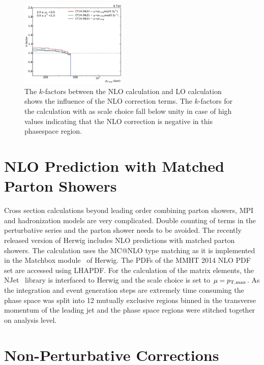 \begin{figure}[htp]
    \includegraphics[width=0.45\textwidth]{figures/theory/kfactor_comp_yb2ys0.pdf}
    \caption{The $k$-factors between the NLO calculation and LO calculation
        shows the influence of the NLO correction terms. The $k$-factors for the
        calculation with \ptavg as scale choice fall below unity in case of high
        \ystar values indicating that the NLO correction is negative in this
        phasespace region.}
    \label{fig:kfactor_comp}
\end{figure}

\section{NLO Prediction with Matched Parton Showers}

Cross section calculations beyond leading order combining parton showers, MPI
and hadronization models are very complicated. Double counting of terms in the
perturbative series and the parton shower needs to be avoided. The recently
released version of Herwig includes NLO predictions with matched parton showers.
The calculation uses the MC@NLO type matching as it is implemented in the
Matchbox module~\cite{Platzer:2011bc} of Herwig. The PDFs of the MMHT 2014 NLO PDF set are accessed
using LHAPDF. For the calculation of the matrix elements, the
NJet~\cite{Badger:2012pg} library is interfaced to Herwig and the scale choice
is set to $\mu = p_{\mathrm{T,max}}$. As the integration and event generation steps are
extremely time consuming the phase space was split into 12 mutually exclusive
regions binned in the transverse momentum of the leading jet and the phase space
regions were stitched together on analysis level.


\section{Non-Perturbative Corrections}
\label{sec:np_factors}

